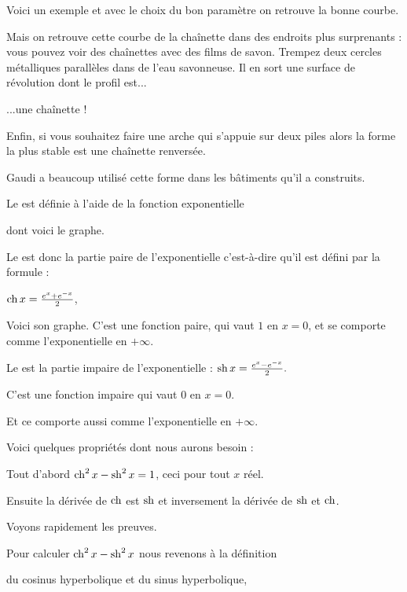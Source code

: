 \change
Voici un exemple et avec le choix du bon paramètre 
on retrouve la bonne courbe.


\change
Mais on  retrouve cette courbe de la chaînette 
dans des endroits plus surprenants : 
vous pouvez voir des chaînettes avec des films de savon. 
Trempez deux cercles métalliques parallèles dans de l'eau savonneuse.
Il en sort une surface de révolution dont le profil est...

\change
...une chaînette !

\change
Enfin, si vous souhaitez faire une arche qui s'appuie sur deux piles 
alors la forme la plus stable est une chaînette renversée.

\change
Gaudi a beaucoup utilisé cette forme dans les bâtiments
qu'il a construits.



\diapo



Le  est définie à l'aide de la fonction exponentielle 

\change
dont voici le graphe.


Le  est donc la partie paire de l'exponentielle
c'est-à-dire qu'il est défini par la formule :

$\mathop{\mathrm{ch}}\nolimits x = \frac{e^x + e^{-x}}{2}$,

\change
Voici son graphe. C'est une fonction paire, qui vaut $1$ en $x=0$,
et se comporte comme l'exponentielle en $+\infty$.

\change
Le  est la partie impaire de l'exponentielle :
$\mathop{\mathrm{sh}}\nolimits x = \frac{e^x - e^{-x}}{2}.$

\change
C'est une fonction impaire
qui vaut $0$ en $x=0$.

Et ce comporte aussi comme l'exponentielle en $+\infty$.

\diapo

Voici quelques propriétés dont nous aurons besoin :

Tout d'abord $\mathop{\mathrm{ch}}\nolimits^2 x - \mathop{\mathrm{sh}}\nolimits^2 x = 1$, ceci pour tout $x$ réel.

\change
Ensuite la dérivée de $\mathop{\mathrm{ch}}\nolimits$ est $\mathop{\mathrm{sh}}\nolimits$
et inversement la dérivée de $\mathop{\mathrm{sh}}\nolimits$ et $\mathop{\mathrm{ch}}\nolimits$.

\change
Voyons rapidement les preuves.

\change
Pour calculer $\mathop{\mathrm{ch}}\nolimits^2 x- \mathop{\mathrm{sh}}\nolimits^2 x$ nous revenons à la définition 

\change
du cosinus hyperbolique et du sinus hyperbolique,

